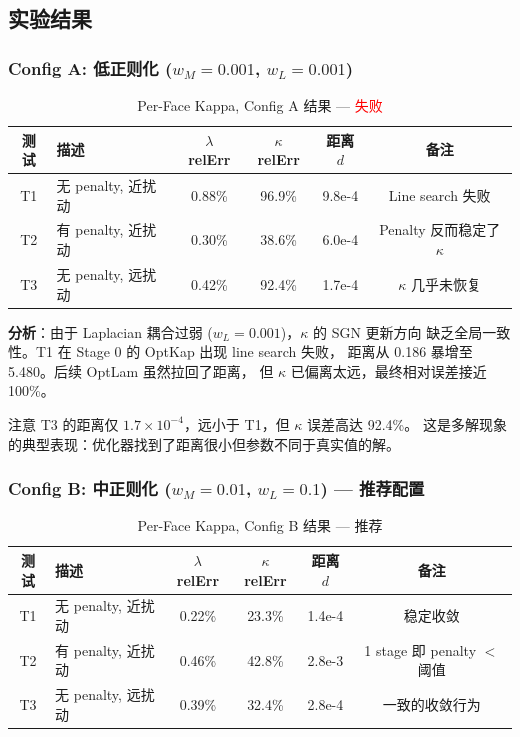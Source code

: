 \documentclass[12pt,a4paper]{article}
\begin{document}
\subsection{实验结果}

\subsubsection{Config A: 低正则化 ($w_M=0.001$, $w_L=0.001$)}

\begin{table}[H]
\centering
\caption{Per-Face Kappa, Config A 结果 --- \textcolor{red}{失败}}
\begin{tabular}{clcccc}
\toprule
测试 & 描述 & $\lambda$ relErr & $\kappa$ relErr & 距离 $d$ & 备注 \\
\midrule
T1 & 无 penalty, 近扰动 & 0.88\% & 96.9\% & 9.8e-4 & Line search 失败 \\
T2 & 有 penalty, 近扰动 & 0.30\% & 38.6\% & 6.0e-4 & Penalty 反而稳定了 $\kappa$ \\
T3 & 无 penalty, 远扰动 & 0.42\% & 92.4\% & 1.7e-4 & $\kappa$ 几乎未恢复 \\
\bottomrule
\end{tabular}
\end{table}

\textbf{分析}：由于 Laplacian 耦合过弱 ($w_L = 0.001$)，$\kappa$ 的 SGN 更新方向
缺乏全局一致性。T1 在 Stage 0 的 OptKap 出现 line search 失败，
距离从 0.186 暴增至 5.480。后续 OptLam 虽然拉回了距离，
但 $\kappa$ 已偏离太远，最终相对误差接近 100\%。

注意 T3 的距离仅 $1.7 \times 10^{-4}$，远小于 T1，但 $\kappa$ 误差高达 92.4\%。
这是多解现象的典型表现：优化器找到了距离很小但参数不同于真实值的解。

\subsubsection{Config B: 中正则化 ($w_M=0.01$, $w_L=0.1$) --- 推荐配置}

\begin{table}[H]
\centering
\caption{Per-Face Kappa, Config B 结果 --- \textcolor{green!50!black}{推荐}}
\begin{tabular}{clcccc}
\toprule
测试 & 描述 & $\lambda$ relErr & $\kappa$ relErr & 距离 $d$ & 备注 \\
\midrule
T1 & 无 penalty, 近扰动 & 0.22\% & 23.3\% & 1.4e-4 & 稳定收敛 \\
T2 & 有 penalty, 近扰动 & 0.46\% & 42.8\% & 2.8e-3 & 1 stage 即 penalty $<$ 阈值 \\
T3 & 无 penalty, 远扰动 & 0.39\% & 32.4\% & 2.8e-4 & 一致的收敛行为 \\
\bottomrule
\end{tabular}
\end{table}
\end{document}
